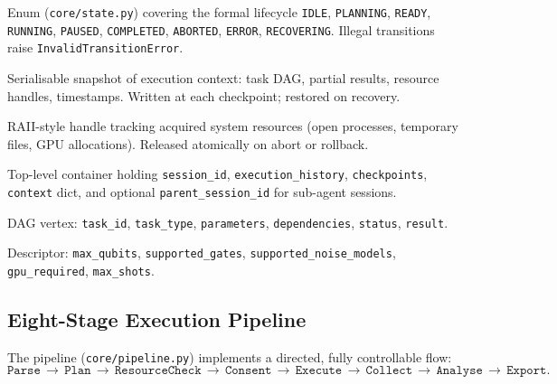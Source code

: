 \documentclass[11pt,a4paper]{article}
\begin{document}
\begin{description}[leftmargin=2.2cm,labelwidth=2.0cm,font=\ttfamily]
  \item[ExecutionState] Enum (\texttt{core/state.py}) covering the formal
        lifecycle \texttt{IDLE}, \texttt{PLANNING}, \texttt{READY},
        \texttt{RUNNING}, \texttt{PAUSED}, \texttt{COMPLETED}, \texttt{ABORTED},
        \texttt{ERROR}, \texttt{RECOVERING}. Illegal transitions raise
        \texttt{InvalidTransitionError}.
  \item[PersistedState] Serialisable snapshot of execution context: task DAG,
        partial results, resource handles, timestamps. Written at each
        checkpoint; restored on recovery.
  \item[ResourceHandle] RAII-style handle tracking acquired system resources
        (open processes, temporary files, GPU allocations). Released atomically
        on abort or rollback.
  \item[Session] Top-level container holding \texttt{session\_id},
        \texttt{execution\_history}, \texttt{checkpoints}, \texttt{context} dict,
        and optional \texttt{parent\_session\_id} for sub-agent sessions.
  \item[TaskNode] DAG vertex: \texttt{task\_id}, \texttt{task\_type},
        \texttt{parameters}, \texttt{dependencies}, \texttt{status},
        \texttt{result}.
  \item[BackendCapabilities] Descriptor: \texttt{max\_qubits},
        \texttt{supported\_gates}, \texttt{supported\_noise\_models},
        \texttt{gpu\_required}, \texttt{max\_shots}.
\end{description}

\subsection{Eight-Stage Execution Pipeline}

The pipeline (\texttt{core/pipeline.py}) implements a directed, fully
controllable flow:
\[
  \texttt{Parse}\,\to\,\texttt{Plan}\,\to\,\texttt{ResourceCheck}\,\to\,
  \texttt{Consent}\,\to\,\texttt{Execute}\,\to\,\texttt{Collect}\,\to\,
  \texttt{Analyse}\,\to\,\texttt{Export}.
\]
\end{document}
